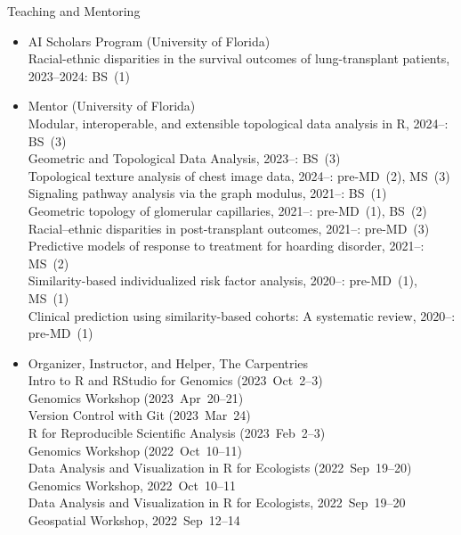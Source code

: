 \documentclass[10pt,a4paper]{article}
\begin{document}
\vspace{.25cm}
{\sc Teaching and Mentoring}
\begin{itemize}[label=$\circ$,nolistsep]
\item
AI Scholars Program (University of Florida) \\
Racial-ethnic disparities in the survival outcomes of lung-transplant patients, 2023--2024: BS~(1)
\item
Mentor (University of Florida) \\
Modular, interoperable, and extensible topological data analysis in R, 2024--: BS~(3) \\
Geometric and Topological Data Analysis, 2023--: BS~(3) \\
Topological texture analysis of chest image data, 2024--: pre-MD~(2), MS~(3) \\
Signaling pathway analysis via the graph modulus, 2021--: BS~(1) \\
Geometric topology of glomerular capillaries, 2021--: pre-MD~(1), BS~(2) \\
Racial--ethnic disparities in post-transplant outcomes, 2021--: pre-MD~(3) \\
Predictive models of response to treatment for hoarding disorder, 2021--: MS~(2) \\
Similarity-based individualized risk factor analysis, 2020--: pre-MD~(1), MS~(1) \\
Clinical prediction using similarity-based cohorts: A systematic review, 2020--: pre-MD~(1)
\item
Organizer, Instructor, and Helper, The Carpentries \\
Intro to R and RStudio for Genomics (2023~Oct~2--3) \\
Genomics Workshop (2023~Apr~20--21) \\
Version Control with Git (2023~Mar~24) \\
R for Reproducible Scientific Analysis (2023~Feb~2--3) \\
Genomics Workshop (2022~Oct~10--11) \\
Data Analysis and Visualization in R for Ecologists (2022~Sep~19--20) \\
Genomics Workshop, 2022~Oct~10--11 \\
Data Analysis and Visualization in R for Ecologists, 2022~Sep~19--20 \\
Geospatial Workshop, 2022~Sep~12--14 \\

\end{itemize}
\end{document}
